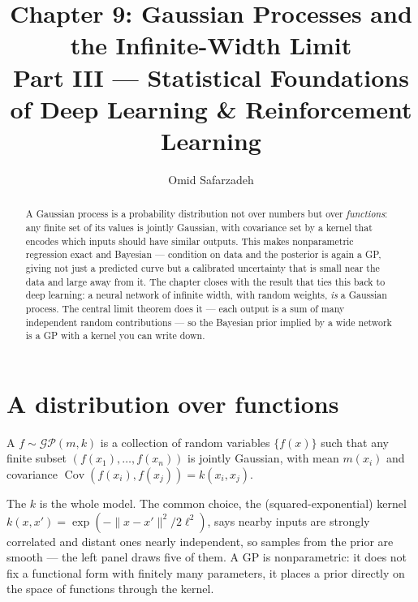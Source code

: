 \documentclass[11pt]{article}
\title{Chapter 9: Gaussian Processes and the Infinite-Width Limit \\ \large Part III --- Statistical Foundations of Deep Learning \& Reinforcement Learning}
\author{Omid Safarzadeh}
\date{}
\begin{document}
\maketitle

\begin{abstract}
\noindent
A Gaussian process is a probability distribution not over numbers but over
\emph{functions}: any finite set of its values is jointly Gaussian, with
covariance set by a kernel that encodes which inputs should have similar outputs.
This makes nonparametric regression exact and Bayesian --- condition on data and
the posterior is again a GP, giving not just a predicted curve but a calibrated
uncertainty that is small near the data and large away from it. The chapter
closes with the result that ties this back to deep learning: a neural network of
infinite width, with random weights, \emph{is} a Gaussian process. The central
limit theorem does it --- each output is a sum of many independent random
contributions --- so the Bayesian prior implied by a wide network is a GP with a
kernel you can write down.
\end{abstract}

\tableofcontents

\section{A distribution over functions}

\begin{definition}
A  $f\sim\mathcal{GP}(m,k)$ is a collection of random
variables $\{f(x)\}$ such that any finite subset $(f(x_1),\dots,f(x_n))$ is
jointly Gaussian, with mean $m(x_i)$ and covariance
$\operatorname{Cov}(f(x_i),f(x_j))=k(x_i,x_j)$.
\end{definition}

The  $k$ is the whole model. The common choice, the 
(squared-exponential) kernel $k(x,x')=\exp(-\|x-x'\|^2/2\ell^2)$, says nearby
inputs are strongly correlated and distant ones nearly independent, so samples
from the prior are smooth --- the left panel draws five of them. A GP is
nonparametric: it does not fix a functional form with finitely many parameters,
it places a prior directly on the space of functions through the kernel.

\end{document}
